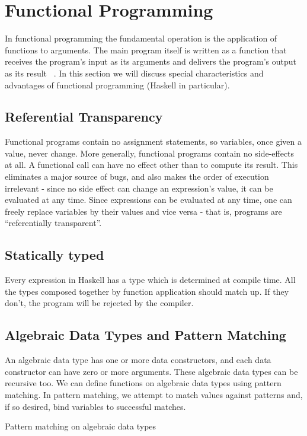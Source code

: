 \chapter{Functional Programming}
\label{chap:funcprog}

In functional programming the fundamental operation is the application of
functions to arguments. The main program itself is written as a function that
receives the program's input as its arguments and delivers the program's output as its result ~\cite{hughes1989functional}.
In this section we will discuss special characteristics and advantages of functional programming (Haskell in particular).

\section{Referential Transparency}
Functional programs contain no assignment statements, so variables, once given a value, never change. More generally, functional programs contain no side-effects at all. A functional call can have no effect other than to compute its result.
This eliminates a major source of bugs, and also makes the order of execution irrelevant - since no side effect can change an expression's value, it can be evaluated at any time. Since expressions can be evaluated at any time, one can freely replace variables by their values and vice versa - that is, programs are ``referentially transparent''.

\section{Statically typed}
Every expression in Haskell has a type which is determined at compile time. All the types composed together by function application should match up. If they don't, the program will be rejected by the compiler.

\section{Algebraic Data Types and Pattern Matching}
An algebraic data type has one or more data constructors, and each data constructor can have zero or more arguments. These algebraic data types can be recursive too.
We can define functions on algebraic data types using pattern matching. In pattern matching, we attempt to match values against patterns and, if so desired, bind variables to successful matches.

\begin{program}
  \caption{Pattern matching on algebraic data types}
  \label{prog:shapes}
  \inputminted{haskell}{hs/shapes.hs}
\end{program}

